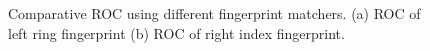 \begin{figure}[h]
    \centering
    \caption{Comparative ROC using different fingerprint matchers. (a) ROC of left ring fingerprint (b) ROC of right index fingerprint.}
    \label{compare-fusion}
\end{figure}

